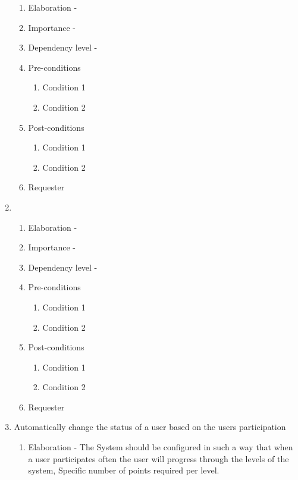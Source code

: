 \documentclass[12pt]{article}
\begin{document}
\begin{enumerate}
\begin{enumerate}
    \item Elaboration - 
    \item Importance - 
    \item Dependency level - 
    \item Pre-conditions
    \begin{enumerate}
    	\item Condition 1
    	\item Condition 2
    \end{enumerate}
        \item Post-conditions
    \begin{enumerate}
    	\item Condition 1
    	\item Condition 2
    \end{enumerate}
    \item Requester
  \end{enumerate}
\newpage %
   \item  %
  \begin{enumerate}
    \item Elaboration - 
    \item Importance - 
    \item Dependency level - 
    \item Pre-conditions
    \begin{enumerate}
    	\item Condition 1
    	\item Condition 2
    \end{enumerate}
        \item Post-conditions
    \begin{enumerate}
    	\item Condition 1
    	\item Condition 2
    \end{enumerate}
    \item Requester
  \end{enumerate}
\newpage %
   \item Automatically change the status of a user based on the users participation %
  \begin{enumerate}
    \item Elaboration - The System should be configured in such a way that when a user participates often the user will progress through the levels of the system, Specific number of points required per level.

\end{enumerate}
\end{enumerate}
\end{document}
